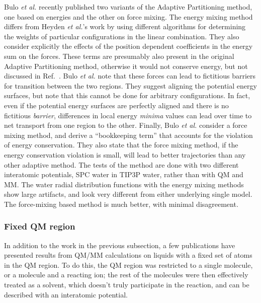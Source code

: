 \documentclass[11pt]{revtex4}
\begin{document}
Bulo {\it et al.} recently published two variants of the Adaptive
Partitioning method\cite{bulo_j_chem_theor_comp_2009a}, one based
on energies and the other on force mixing.  The energy mixing method
differs from Heyden {\it et al.}'s work by using different algorithms
for determining the weights of particular configurations in the
linear combination.  They also consider explicitly the effects of
the position dependent coefficients in the energy sum on the forces.
These terms are presumably also present in the original Adaptive
Partitioning method, otherwise it would not conserve energy, but
not discussed in Ref.~.   Bulo
{\it et al.} note that these forces can lead to fictitious barriers
for transition between the two regions.  They suggest aligning the
potential energy surfaces, but note that this cannot be done for
arbitrary configurations.  In fact, even if the potential energy
surfaces are perfectly aligned and there is no fictitious {\em
barrier}, differences in local energy {\em minima} values can lead
over time to net transport from one region to the other.  Finally,
Bulo {\it et al.} consider a force mixing method, and derive a
``bookkeeping term'' that accounts for the violation of energy
conservation.  They also state that the force mixing method, if the
energy conservation violation is small, will lead to better
trajectories than any other adaptive method.  The tests of the
method are done with two different interatomic potentials, SPC water
in TIP3P water, rather than with QM and MM.   The water radial
distribution functions with the energy mixing methods show large
artifacts, and look very different from either underlying single
model.  The force-mixing based method is much better, with minimal
disagreement.

\subsubsection{Fixed QM region}

In addition to the work in the previous subsection, a few publications
have presented results from QM/MM calculations on liquids with a
fixed set of atoms in the QM region.  To do this, the QM region was
restricted to a single molecule, or a molecule and a reacting ion;
the rest of the molecules were then effectively treated as a solvent,
which doesn't truly participate in the reaction, and can be described
with an interatomic potential.
\end{document}
